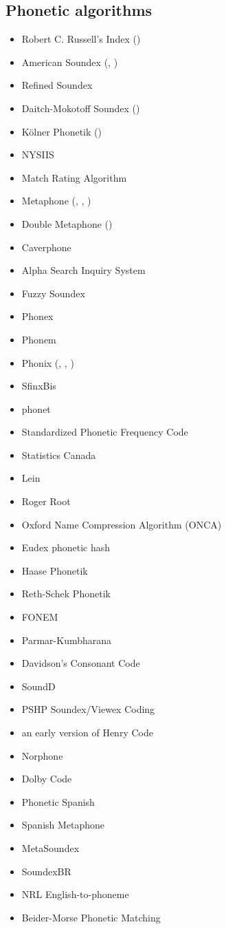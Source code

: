 \documentclass[12pt,a4paper]{article}
\begin{document}
	\subsection{Phonetic algorithms}
	\begin{itemize}\itemsep-4pt
		\item {\color{red} Robert C. Russell's Index} (\cite{Russell:1917})
		\item {\color{red} American Soundex} (\cite{US:2007}, \cite{Knuth:1998})
		\item Refined Soundex
		\item {\color{red} Daitch-Mokotoff Soundex} (\cite{Mokotoff:1997})
		\item {\color{red} Kölner Phonetik} (\cite{Postel:1969})
		\item NYSIIS
		\item Match Rating Algorithm
		\item {\color{red} Metaphone} (\cite{Philips:1990}, \cite{Philips:1990b}, \cite{Kuhn:1995})
		\item {\color{red} Double Metaphone} (\cite{Philips:2000})
		\item Caverphone
		\item Alpha Search Inquiry System
		\item {\color{red} Fuzzy Soundex} \cite{Holmes:2002}
		\item Phonex
		\item Phonem
		\item {\color{red} Phonix} (\cite{Pfeifer:2000}, \cite{Christen:2011}, \cite{Kollar:2007})
		\item SfinxBis
		\item phonet
		\item Standardized Phonetic Frequency Code
		\item Statistics Canada
		\item Lein
		\item Roger Root
		\item Oxford Name Compression Algorithm (ONCA)
		\item Eudex phonetic hash
		\item Haase Phonetik
		\item Reth-Schek Phonetik
		\item FONEM
		\item Parmar-Kumbharana
		\item Davidson's Consonant Code
		\item SoundD
		\item PSHP Soundex/Viewex Coding
		\item an early version of Henry Code
		\item Norphone
		\item Dolby Code
		\item Phonetic Spanish
		\item Spanish Metaphone
		\item MetaSoundex
		\item SoundexBR
		\item NRL English-to-phoneme
		\item Beider-Morse Phonetic Matching
	\end{itemize}
	
\end{document}
